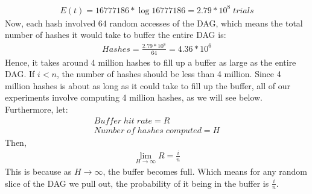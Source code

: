 \documentclass[10pt, conference, compsocconf]{IEEEtran}
\begin{document}
\begin{gather}
  E(t) = 16777186*\log{16777186} = 2.79*10^8\;trials
\end{gather}
Now, each hash involved 64 random accesses of the DAG, which means the total number of hashes it would take to buffer the entire DAG is:
\begin{gather}
  Hashes = \frac{2.79*10^8}{64} = 4.36*10^6
\end{gather}
Hence, it takes around 4 million hashes to fill up a buffer as large as the entire DAG. If $i < n$, the number of hashes should be less than 4 million. Since 4 million hashes is about as long as it could take to fill up the buffer, all of our experiments involve computing 4 million hashes, as we will see below.
Furthermore, let:
\begin{gather}
  Buffer\;hit\;rate = R \\
    Number\;of\;hashes\;computed = H
\end{gather}
Then,
\begin{gather}
  \lim_{H\to\infty}R = \frac{i}{n}
\end{gather}
This is because as $H\to\infty$, the buffer becomes full. Which means for any random slice of the DAG we pull out, the probability of it being in the buffer is $\frac{i}{n}$.
\end{document}
